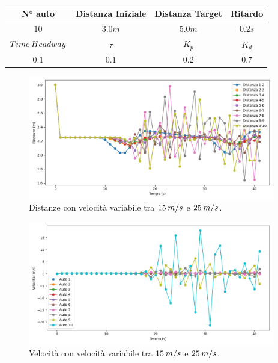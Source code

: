 \begin{table}[h]
    \centering
    \begin{tabular}{|c|c|c|c|}
        \hline
        N° auto & Distanza Iniziale & Distanza Target & Ritardo \\
        \hline
        $10$ & $3.0 m$ & $5.0 m$ & $0.2 s$ \\
        \hline
        $Time\hspace{0.2em}Headway$ & $\tau$ & $K_p$ & $K_d$  \\
        \hline
        $0.1$ & $0.1$ & $0.2$ & $0.7$ \\
        \hline
    \end{tabular}
\end{table}

\begin{figure}[H]
    \includegraphics[width=0.96\textwidth]{images/5-experiment/compost/distance_c.png}
    \caption{Distanze con velocità variabile tra $15\hspace{0.2em}m/s$ e $25\hspace{0.2em}m/s$.}
    \label{fig:c-compost-distance}
\end{figure}

\begin{figure}[H]
    \includegraphics[width=0.96\textwidth]{images/5-experiment/compost/velocity_c.png}
    \caption{Velocità con velocità variabile tra $15\hspace{0.2em}m/s$ e $25\hspace{0.2em}m/s$.}
    \label{fig:c-compost-velocity}
\end{figure}

